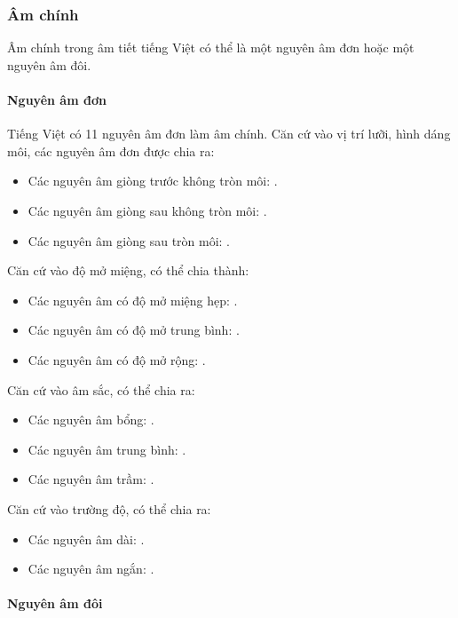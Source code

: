 \documentclass[a4paper,oneside,14pt]{extbook} %
\begin{document}
\subsubsection{Âm chính}

Âm chính trong âm tiết tiếng Việt có thể là một nguyên âm đơn hoặc một
nguyên âm đôi.


\paragraph{Nguyên âm đơn}

Tiếng Việt có 11 nguyên âm đơn làm âm chính. Căn cứ vào vị trí lưỡi,
hình dáng môi, các nguyên âm đơn được chia ra:
\begin{itemize}
\item Các nguyên âm giòng trước không tròn môi: .
\item Các nguyên âm giòng sau không tròn môi: .
\item Các nguyên âm giòng sau tròn môi: .
\end{itemize}

Căn cứ vào độ mở miệng, có thể chia thành:
\begin{itemize}
\item Các nguyên âm có độ mở miệng hẹp: .
\item Các nguyên âm có độ mở trung bình: .
\item Các nguyên âm có độ mở rộng: .
\end{itemize}

Căn cứ vào âm sắc, có thể chia ra:
\begin{itemize}
\item Các nguyên âm bổng: .
\item Các nguyên âm trung bình: .
\item Các nguyên âm trầm: .
\end{itemize}

Căn cứ vào trường độ, có thể chia ra:
\begin{itemize}
\item Các nguyên âm dài: .
\item Các nguyên âm ngắn: .
\end{itemize}


\paragraph{Nguyên âm đôi}
\end{document}
